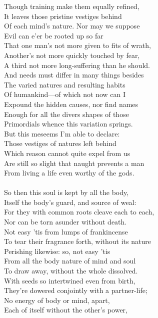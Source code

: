 Though training make them equally refined,\\
It leaves those pristine vestiges behind\\
Of each mind's nature. Nor may we suppose\\
Evil can e'er be rooted up so far\\
That one man's not more given to fits of wrath,\\
Another's not more quickly touched by fear,\\
A third not more long-suffering than he should.\\
And needs must differ in many things besides\\
The varied natures and resulting habits\\
Of humankind—of which not now can I\\
Expound the hidden causes, nor find names\\
Enough for all the divers shapes of those\\
Primordials whence this variation springs.\\
But this meseems I'm able to declare:\\
Those vestiges of natures left behind\\
Which reason cannot quite expel from us\\
Are still so slight that naught prevents a man\\
From living a life even worthy of the gods.\\
\\
So then this soul is kept by all the body,\\
Itself the body's guard, and source of weal:\\
For they with common roots cleave each to each,\\
Nor can be torn asunder without death.\\
Not easy 'tis from lumps of frankincense\\
To tear their fragrance forth, without its nature\\
Perishing likewise: so, not easy 'tis\\
From all the body nature of mind and soul\\
To draw away, without the whole dissolved.\\
With seeds so intertwined even from birth,\\
They're dowered conjointly with a partner-life;\\
No energy of body or mind, apart,\\
Each of itself without the other's power,\\

